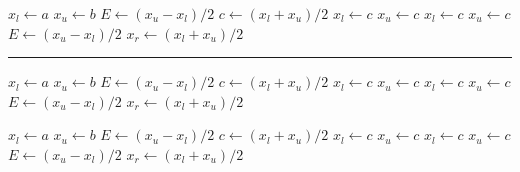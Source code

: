 \documentclass{article}
\begin{document}
\begin{algorithmic}[1] %
\State $x_l \gets a$ %
\State $x_u \gets b$
\State $E \gets (x_u - x_l)/2$
	\State $c \gets (x_l + x_u)/2$
		\State $x_l \gets c$
		\State $x_u \gets c$
		\State $x_l \gets c$
		\State $x_u \gets c$
	\EndIf
	\State $E \gets (x_u - x_l)/2$
\EndWhile
\State $x_r \gets (x_l + x_u)/2$
\State {}
\end{algorithmic}

\lipsum[1][4-5]

\bigskip
\hrule
\bigskip

\lipsum[1][1-3]

\begin{center}
\fbox
{
\begin{minipage}{0.5\textwidth}
\smallskip
\begin{algorithmic}[1]
\State $x_l \gets a$
\State $x_u \gets b$
\State $E \gets (x_u - x_l)/2$
	\State $c \gets (x_l + x_u)/2$
		\State $x_l \gets c$
		\State $x_u \gets c$
		\State $x_l \gets c$
		\State $x_u \gets c$
	\EndIf
	\State $E \gets (x_u - x_l)/2$
\EndWhile
\State $x_r \gets (x_l + x_u)/2$
\State {}
\end{algorithmic}
\end{minipage}
}
\end{center}

\lipsum[1][4-5]

\newpage


\lipsum[1][1-3]

\begin{algorithm}
\caption{Bisection method.}
\label{alg:bisection}
\begin{algorithmic}[1]
\State $x_l \gets a$
\State $x_u \gets b$
\State $E \gets (x_u - x_l)/2$
	\State $c \gets (x_l + x_u)/2$
		\State $x_l \gets c$
		\State $x_u \gets c$
		\State $x_l \gets c$
		\State $x_u \gets c$
	\EndIf
	\State $E \gets (x_u - x_l)/2$
\EndWhile
\State $x_r \gets (x_l + x_u)/2$
\State {}
\end{algorithmic}
\end{algorithm}
\end{document}
